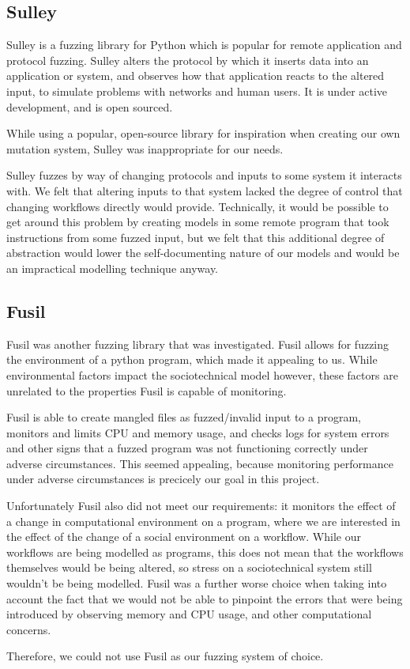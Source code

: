 \subsection{Sulley}
\label{fuzzing_sulley}
Sulley is a fuzzing library for Python which is popular for remote application and protocol fuzzing. Sulley alters the protocol by which it inserts data into an application or system, and observes how that application reacts to the altered input, to simulate problems with networks and human users. It is under active development, and is open sourced.\par
While using a popular, open-source library for inspiration when creating our own mutation system, Sulley was inappropriate for our needs.\par
Sulley fuzzes by way of changing protocols and inputs to some system it interacts with. We felt that altering inputs to that system lacked the degree of control that changing workflows directly would provide. Technically, it would be possible to get around this problem by creating models in some remote program that took instructions from some fuzzed input, but we felt that this additional degree of abstraction would lower the self-documenting nature of our models and would be an impractical modelling technique anyway. \par

\subsection{Fusil}
\label{fuzzing_fuzil}
Fusil was another fuzzing library that was investigated. Fusil allows for fuzzing the environment of a python program, which made it appealing to us. While environmental factors impact the sociotechnical model however, these factors are unrelated to the properties Fusil is capable of monitoring. \par
Fusil is able to create mangled files as fuzzed/invalid input to a program, monitors and limits CPU and memory usage, and checks logs for system errors and other signs that a fuzzed program was not functioning correctly under adverse circumstances. This seemed appealing, because monitoring performance under adverse circumstances is precicely our goal in this project. \par
Unfortunately Fusil also did not meet our requirements: it monitors the effect of a change in computational environment on a program, where we are interested in the effect of the change of a social environment on a workflow. While our workflows are being modelled as programs, this does not mean that the workflows themselves would be being altered, so stress on a sociotechnical system still wouldn't be being modelled. Fusil was a further worse choice when taking into account the fact that we would not be able to pinpoint the errors that were being introduced by observing memory and CPU usage, and other computational concerns. \par
Therefore, we could not use Fusil as our fuzzing system of choice. \par

